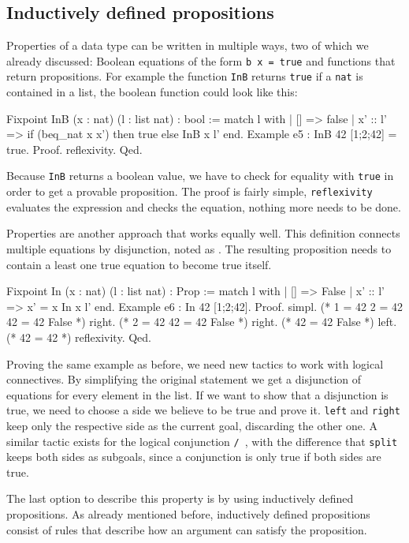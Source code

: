 \documentclass[paper = a4, fleqn, abstract=on, twoside]{scrreprt}
\newcommand{\coqinline}[1]{\texttt{#1}}
\begin{document}
\subsection{Inductively defined propositions}
\label{induprop}
Properties of a data type can be written in multiple ways, two of which we already discussed: Boolean equations of the form \coqinline{b x = true} and functions that return propositions. For example the function \coqinline{InB} returns \coqinline{true} if a \coqinline{nat} is contained in a list, the boolean function could look like this:
\begin{coqcode}
Fixpoint InB (x : nat) (l : list nat) : bool :=
match l with
| [] => false
| x' :: l' => if (beq_nat x x') then true else InB x l'
end.
Example e5 : InB 42 [1;2;42] = true.
Proof. reflexivity. Qed.
\end{coqcode}
Because \coqinline{InB} returns a boolean value, we have to check for equality with \coqinline{true} in order to get a provable proposition. The proof is fairly simple, \coqinline{reflexivity} evaluates the expression and checks the equation, nothing more needs to be done.
\par 
Properties are another approach that works equally well. This definition connects multiple equations by disjunction, noted as \coqinline{\/}. The resulting proposition needs to contain a least one true equation to become true itself.
\begin{coqcode}
Fixpoint In (x : nat) (l : list nat) : Prop :=
match l with
| [] => False
| x' :: l' => x' = x \/ In x l'
end.
Example e6 : In 42 [1;2;42].
Proof. 
  simpl. (* 1 = 42 \/ 2 = 42 \/ 42 = 42 \/ False *)
  right.           (* 2 = 42 \/ 42 = 42 \/ False *)
  right.                     (* 42 = 42 \/ False *)
  left.                      (* 42 = 42 *)
  reflexivity.
Qed.
\end{coqcode}
Proving the same example as before, we need new tactics to work with logical connectives. By simplifying the original statement we get a disjunction of equations for every element in the list. If we want to show that a disjunction is true, we need to choose a side we believe to be true and prove it. \coqinline{left} and \coqinline{right} keep only the respective side as the current goal, discarding the other one. A similar tactic exists for the logical conjunction \coqinline{/\ }, with the difference that \coqinline{split} keeps both sides as subgoals, since a conjunction is only true if both sides are true.
\par
The last option to describe this property is by using inductively defined propositions. As already mentioned before, inductively defined propositions consist of rules that describe how an argument can satisfy the proposition.
\end{document}
